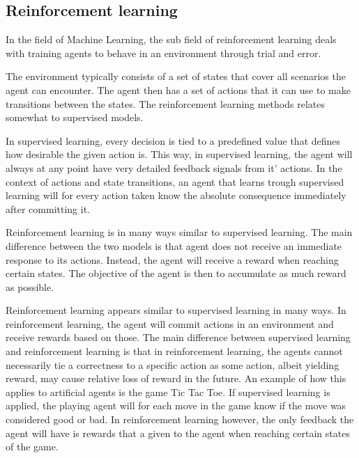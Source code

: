 \subsection{Reinforcement learning \label{RL}}

In the field of Machine Learning, the sub field of reinforcement learning
deals with training agents to behave in an environment through
trial and error.

The environment typically consists of a set of states that cover all
scenarios the agent can encounter. The agent then has a set of actions
that it can use to make transitions between the states. 
The reinforcement learning methods relates somewhat 
to supervised models.

In supervised learning, every decision is tied to a predefined value
that defines how desirable the given action is. This way, in supervised learning,
the agent will always at any point have very detailed feedback signals from it' actions.
In the context of actions and state transitions, an agent that learns trough
supervised learning will for every action taken know the absolute consequence
immediately after committing it.

Reinforcement learning is in many ways similar to supervised learning. 
The main difference between the two models is that agent does not receive 
an immediate response to its actions. Instead, the agent will receive a reward
when reaching certain states. The objective of the agent is then to
accumulate as much reward as possible.

Reinforcement learning appears similar to supervised learning in many ways.
In reinforcement learning, the agent will commit actions in an environment
and receive rewards based on those. The main difference between supervised
learning and reinforcement learning is that in reinforcement learning,
the agents cannot necessarily tie a correctness 
to a specific action as some action, albeit yielding reward,
may cause relative loss of reward in the future. An example of how this applies 
to artificial agents is the game Tic Tac Toe. If supervised learning
is applied, the playing agent will for each move in the game know
if the move was considered good or bad. In reinforcement learning however,
the only feedback the agent will have is rewards that a given 
to the agent when reaching certain states of the game. 




